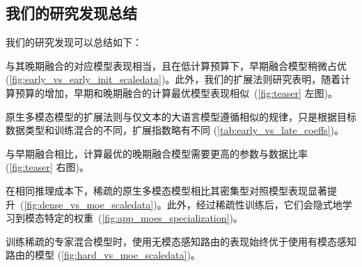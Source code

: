
\subsection{我们的研究发现总结}
我们的研究发现可以总结如下：

 
与其晚期融合的对应模型表现相当，且在低计算预算下，早期融合模型稍微占优
(\cref{fig:early_vs_early_init_scaledata})。此外，我们的扩展法则研究表明，随着计算预算的增加，早期和晚期融合的计算最优模型表现相似~(\cref{fig:teaser} 左图)。

 原生多模态模型的扩展法则与仅文本的大语言模型遵循相似的规律，只是根据目标数据类型和训练混合的不同，扩展指数略有不同
(\cref{tab:early_vs_late_coeffs})。

 与早期融合相比，计算最优的晚期融合模型需要更高的参数与数据比率
(\cref{fig:teaser} 右图)。

 在相同推理成本下，稀疏的原生多模态模型相比其密集型对照模型表现显著提升~(\cref{fig:dense_vs_moe_scaledata})。此外，经过稀疏性训练后，它们会隐式地学习到模态特定的权重~(\cref{fig:app_moes_specialization})。 

 训练稀疏的专家混合模型时，使用无模态感知路由的表现始终优于使用有模态感知路由的模型
(\cref{fig:hard_vs_moe_scaledata})。

\vspace{-5pt}
